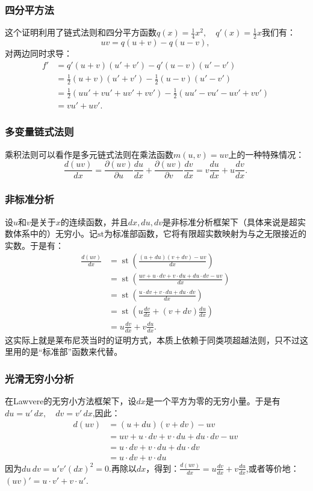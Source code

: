 \subsubsection{四分平方法}
这个证明利用了链式法则和四分平方函数$q(x) = \tfrac{1}{4}x^{2}, \quad q'(x) = \tfrac{1}{2}x$我们有：
$$
uv = q(u+v) - q(u-v),~
$$
对两边同时求导：
$$
\begin{aligned}
f' &= q'(u+v)(u' + v') - q'(u-v)(u' - v') \\[6pt]
&= \tfrac{1}{2}(u+v)(u' + v') - \tfrac{1}{2}(u-v)(u' - v') \\[6pt]
&= \tfrac{1}{2}(uu' + vu' + uv' + vv') - \tfrac{1}{2}(uu' - vu' - uv' + vv') \\[6pt]
&= vu' + uv'.
\end{aligned}~
$$
\subsubsection{多变量链式法则}
乘积法则可以看作是多元链式法则在乘法函数$m(u, v) = uv$上的一种特殊情况：
$$
\frac{d(uv)}{dx} = \frac{\partial (uv)}{\partial u}\frac{du}{dx} + \frac{\partial (uv)}{\partial v}\frac{dv}{dx} = v\frac{du}{dx} + u\frac{dv}{dx}.~
$$
\subsubsection{非标准分析}
设$u$和$v$是关于$x$的连续函数，并且$dx, du, dv$是非标准分析框架下（具体来说是超实数体系中的）无穷小。记$\mathrm{st}$为标准部函数，它将有限超实数映射为与之无限接近的实数。于是有：
$$
\begin{aligned}
\frac{d(uv)}{dx}
&= \operatorname{st}\!\left(\frac{(u+du)(v+dv)-uv}{dx}\right)\\
&= \operatorname{st}\!\left(\frac{uv+u\cdot dv+v\cdot du+du\cdot dv - uv}{dx}\right)\\
&= \operatorname{st}\!\left(\frac{u\cdot dv+v\cdot du+du\cdot dv}{dx}\right)\\
&= \operatorname{st}\!\left(u\frac{dv}{dx}+(v+dv)\frac{du}{dx}\right)\\
&= u\frac{dv}{dx}+v\frac{du}{dx}.
\end{aligned}~
$$
这实际上就是莱布尼茨当时的证明方式，本质上依赖于同类项超越法则，只不过这里用的是“标准部”函数来代替。
\subsubsection{光滑无穷小分析}
在Lawvere的无穷小方法框架下，设$dx$是一个平方为零的无穷小量。于是有$du = u'\,dx, \quad dv = v'\,dx$,因此：
$$
\begin{aligned}
d(uv) &= (u+du)(v+dv) - uv \\
&= uv + u\cdot dv + v\cdot du + du\cdot dv - uv \\
&= u\cdot dv + v\cdot du + du\cdot dv \\
&= u\cdot dv + v\cdot du
\end{aligned}~
$$
因为$du\,dv = u'v'(dx)^2 = 0$.再除以$dx$，得到：$\frac{d(uv)}{dx} = u\frac{dv}{dx} + v\frac{du}{dx}$,或者等价地：$(uv)' = u\cdot v' + v\cdot u'$.